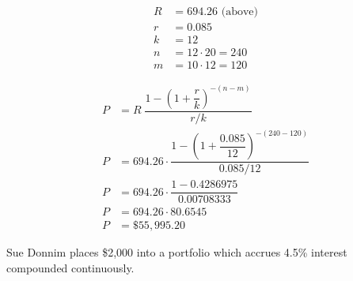 \documentclass[12pt,letterpaper]{exam}
\begin{document}
\begin{questions}
\begin{parts}
{\itshape
\begin{minipage}[c]{0.45\textwidth}
	\[
	\begin{aligned}
	R&= 694.26 \text{ (above)} \\
	r&= 0.085 \\
	k&= 12 \\
	n&= 12 \cdot 20= 240 \\
	m&= 10 \cdot 12= 120 
	\end{aligned}
	\]
\end{minipage}%
\begin{minipage}[b]{0.45\textwidth}
	\[
	\begin{aligned}
	P&= R\; \dfrac{1 - \left( 1 + \dfrac{r}{k} \right)^{-(n - m)}}{r/k} \\[0.3cm]
	P&= 694.26 \cdot \dfrac{1 - \left( 1 + \dfrac{0.085}{12} \right)^{-(240 - 120)}}{0.085/12} \\[0.3cm]
	P&= 694.26 \cdot \dfrac{1 - 0.4286975}{0.00708333} \\[0.3cm]
	P&= 694.26 \cdot 80.6545 \\[0.3cm]
	P&= \$55,995.20
	\end{aligned}
	\]
\end{minipage}
}
        \end{parts}





\newpage
\question[10] Sue Donnim places \$2,000 into a portfolio which accrues 4.5\% interest compounded continuously. \pspace
\end{questions}
\end{document}
